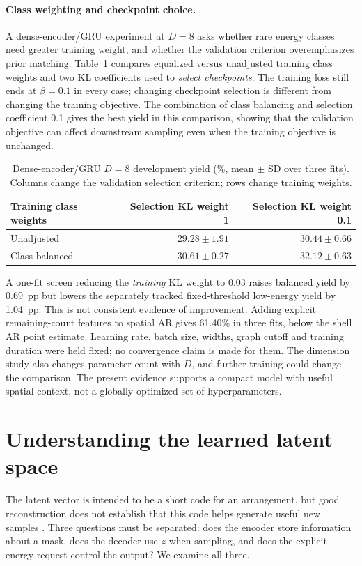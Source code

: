 \documentclass{article}
\begin{document}
\paragraph{Class weighting and checkpoint choice.}
A dense-encoder/GRU experiment at $D=8$ asks whether rare energy classes need greater
training weight, and whether the validation criterion overemphasizes prior
matching. Table~\ref{tab:policy} compares equalized versus unadjusted training
class weights and two KL coefficients used to \emph{select checkpoints}. The
training loss still ends at $\beta=0.1$ in every case; changing checkpoint
selection is different from changing the training objective. The combination
of class balancing and selection coefficient 0.1 gives the best yield in this
comparison, showing that the validation objective can affect downstream
sampling even when the training objective is unchanged.

\begin{table}[htbp]
\centering\small
\caption{Dense-encoder/GRU $D=8$ development yield (\%, mean $\pm$ SD over three fits).
Columns change the validation selection criterion; rows change training weights.}
\label{tab:policy}
\begin{tabular}{@{}lrr@{}}
\toprule Training class weights & Selection KL weight 1 & Selection KL weight 0.1\\
\midrule
Unadjusted & $29.28\pm1.91$ & $30.44\pm0.66$\\
Class-balanced & $30.61\pm0.27$ & $32.12\pm0.63$\\
\bottomrule
\end{tabular}
\end{table}

A one-fit screen reducing the \emph{training} KL weight to 0.03 raises balanced
yield by 0.69~pp but lowers the separately tracked fixed-threshold low-energy
yield by 1.04~pp. This is not consistent evidence of improvement. Adding explicit
remaining-count features to spatial AR gives 61.40\% in three fits, below the
shell AR point estimate. Learning rate, batch size, widths, graph cutoff and
training duration were held fixed; no convergence claim is made for them.
The dimension study also changes parameter count with $D$, and further training
could change the comparison. The present evidence supports a compact model
with useful spatial context, not a globally optimized set of hyperparameters.

\section{Understanding the learned latent space}
The latent vector is intended to be a short code for an arrangement, but good
reconstruction does not establish that this code helps generate useful new
samples \citep{alemi2018}. Three questions must be separated: does the encoder
store information about a mask, does the decoder use $z$ when sampling, and
does the explicit energy request control the output? We examine all three.
\end{document}
